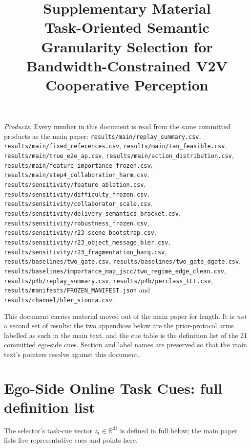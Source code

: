 \documentclass[journal]{IEEEtran}
\begin{document}
\title{Supplementary Material\\ Task-Oriented Semantic Granularity Selection for
Bandwidth-Constrained V2V Cooperative Perception}
\maketitle

\noindent \noindent\emph{Products.} Every number in this document is read from the same committed products as
the main paper: \texttt{results/main/replay\_summary.csv},
\texttt{results/main/fixed\_references.csv}, \texttt{results/main/tau\_feasible.csv},
\texttt{results/main/true\_e2e\_ap.csv}, \texttt{results/main/action\_distribution.csv},
\texttt{results/main/feature\_importance\_frozen.csv},
\texttt{results/main/step4\_collaboration\_harm.csv},
\texttt{results/sensitivity/feature\_ablation.csv},
\texttt{results/sensitivity/difficulty\_frozen.csv},
\texttt{results/sensitivity/collaborator\_scale.csv},
\texttt{results/sensitivity/delivery\_semantics\_bracket.csv},
\texttt{results/sensitivity/robustness\_frozen.csv},
\texttt{results/sensitivity/r23\_scene\_bootstrap.csv},
\texttt{results/sensitivity/r23\_object\_message\_bler.csv},
\texttt{results/sensitivity/r23\_fragmentation\_harq.csv},
\texttt{results/baselines/two\_gate.csv}, \texttt{results/baselines/two\_gate\_dgate.csv},
\texttt{results/baselines/importance\_map\_jscc/two\_regime\_edge\_clean.csv},
\texttt{results/p4b/replay\_summary.csv}, \texttt{results/p4b/perclass\_ELF.csv},
\texttt{results/manifests/FROZEN\_MANIFEST.json} and
\texttt{results/channel/bler\_sionna.csv}.

This document carries material moved out of the main paper for length. It is
\emph{not} a second set of results: the two appendices below are the prior-protocol arms
labelled as such in the main text, and the cue table is the definition list of the 21
committed ego-side cues. Section and label names are preserved so that the main text's
pointers resolve against this document.

\section{Ego-Side Online Task Cues: full definition list}\label{sec:cues_full}
The selector's task-cue vector $z_t\in\mathbb{R}^{21}$ is defined in full below; the main
paper lists five representative cues and points here.
\end{document}
